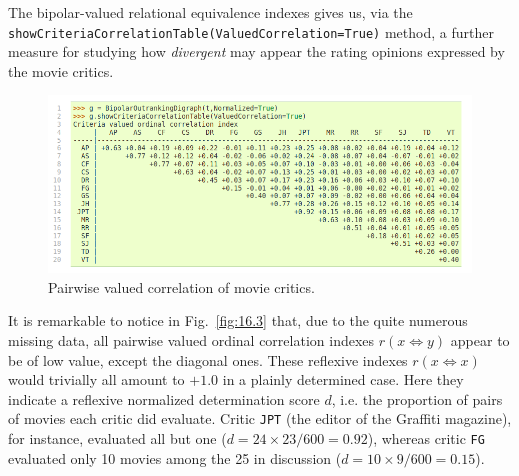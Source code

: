 The bipolar-valued relational equivalence indexes gives us, via the \texttt{showCrite\-riaCorrelationTable(ValuedCorrelation=True)} method, a further measure for studying how \emph{divergent} may appear the rating opinions expressed by the movie critics. 
\begin{figure}[h]
\includegraphics[width=12cm]{Figures/16-3-correlationTable.png}
\caption{Pairwise valued correlation of movie critics.} 
\label{fig:16.3}       %
\end{figure}

It is remarkable to notice in Fig.~\vref{fig:16.3} that, due to the quite numerous missing data, all pairwise valued ordinal correlation indexes $r(x\Leftrightarrow y)$ appear to be of low value, except the diagonal ones. These reflexive indexes $r(x\Leftrightarrow x)$ would trivially all amount to $+1.0$ in a plainly determined case. Here they indicate a reflexive normalized determination score $d$, i.e. the proportion of pairs of movies each critic did evaluate. Critic \texttt{JPT} (the editor of the Graffiti magazine), for instance, evaluated all but one ($d = 24\times23/600 = 0.92$), whereas critic \texttt{FG} evaluated only 10 movies among the 25 in discussion ($d = 10\times9/600 = 0.15$).

